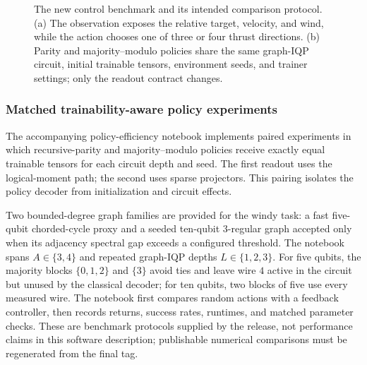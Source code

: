 \documentclass[10pt]{article}
\begin{document}
\begin{figure}[t]
{}
\caption{The new control benchmark and its intended comparison protocol.
(a) The observation exposes the relative target, velocity, and wind, while the
action chooses one of three or four thrust directions.  (b) Parity and
majority--modulo policies share the same graph-IQP circuit, initial trainable
tensors, environment seeds, and trainer settings; only the readout contract
changes.}
\label{fig:windy-and-matched-benchmark}
\end{figure}

\subsubsection{Matched trainability-aware policy experiments}

The accompanying policy-efficiency notebook implements paired experiments in
which recursive-parity and majority--modulo policies receive exactly equal
trainable tensors for each circuit depth and seed.  The first readout uses the
logical-moment path; the second uses sparse projectors.  This pairing isolates
the policy decoder from initialization and circuit effects.

Two bounded-degree graph families are provided for the windy task: a fast
five-qubit chorded-cycle proxy and a seeded ten-qubit $3$-regular graph accepted
only when its adjacency spectral gap exceeds a configured threshold.  The
notebook spans $A\in\{3,4\}$ and repeated graph-IQP depths
$L\in\{1,2,3\}$.  For five qubits, the majority blocks
$\{0,1,2\}$ and $\{3\}$ avoid ties and leave wire $4$ active in the circuit but
unused by the classical decoder; for ten qubits, two blocks of five use every
measured wire.  The notebook first compares random actions with a feedback
controller, then records returns, success rates, runtimes, and matched
parameter checks.  These are benchmark protocols supplied by the release, not
performance claims in this software description; publishable numerical
comparisons must be regenerated from the final tag.
\end{document}
